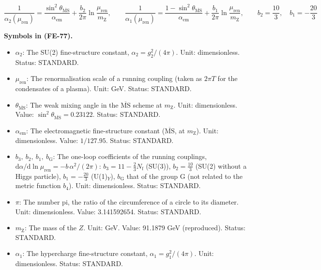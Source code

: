 \documentclass[
  10pt,
]{article}
\providecommand{\tightlist}{%
  \setlength{\itemsep}{0pt}\setlength{\parskip}{0pt}}
\begin{document}
\[
\frac{1}{\alpha_2(\mu_{\mathrm{ren}})} = \frac{\sin^2\theta_{\overline{\mathrm{MS}}}}{\alpha_{\mathrm{em}}}
 + \frac{b_2}{2\pi}\ln\frac{\mu_{\mathrm{ren}}}{m_{\mathrm{Z}}},\qquad
\frac{1}{\alpha_1(\mu_{\mathrm{ren}})} = \frac{1 -
 \sin^2\theta_{\overline{\mathrm{MS}}}}{\alpha_{\mathrm{em}}}
 + \frac{b_1}{2\pi}\ln\frac{\mu_{\mathrm{ren}}}{m_{\mathrm{Z}}},\qquad b_2 = \frac{10}{3},\quad b_1 =
 -\frac{20}{3} \tag{FE-77}
\]

\textbf{Symbols in (FE-77).}

\begin{itemize}
\tightlist
\item
  \(\alpha_2\): The SU(2) fine-structure constant,
  \(\alpha_2 = g_2^2/(4\pi)\). Unit: dimensionless. Status: STANDARD.
\item
  \(\mu_{\mathrm{ren}}\): The renormalisation scale of a running
  coupling (taken as \(2\pi T\) for the condensates of a plasma). Unit:
  GeV. Status: STANDARD.
\item
  \(\theta_{\overline{\mathrm{MS}}}\): The weak mixing angle in the
  \(\overline{\mathrm{MS}}\) scheme at \(m_{\mathrm{Z}}\). Unit:
  dimensionless. Value:
  \(\sin^2\theta_{\overline{\mathrm{MS}}} = 0.23122\). Status: STANDARD.
\item
  \(\alpha_{\mathrm{em}}\): The electromagnetic fine-structure constant
  (\(\overline{\mathrm{MS}}\), at \(m_{\mathrm{Z}}\)). Unit:
  dimensionless. Value: \(1/127.95\). Status: STANDARD.
\item
  \(b_3,\ b_2,\ b_1,\ b_{\mathrm{G}}\): The one-loop coefficients of the
  running couplings,
  \(\mathrm{d}\alpha/\mathrm{d}\ln\mu_{\mathrm{ren}} = -b\,\alpha^2/(2\pi)\):
  \(b_3 = 11 - \frac23N_{\mathrm{f}}\) (SU(3)), \(b_2 = \frac{10}{3}\)
  (SU(2) without a Higgs particle), \(b_1 = -\frac{20}{3}\)
  (U(1)\(_Y\)), \(b_{\mathrm{G}}\) that of the group G (not related to
  the metric function \(b_4\)). Unit: dimensionless. Status: STANDARD.
\item
  \(\pi\): The number pi, the ratio of the circumference of a circle to
  its diameter. Unit: dimensionless. Value: 3.141592654. Status:
  STANDARD.
\item
  \(m_{\mathrm{Z}}\): The mass of the \(Z\). Unit: GeV. Value: 91.1879
  GeV (reproduced). Status: STANDARD.
\item
  \(\alpha_1\): The hypercharge fine-structure constant,
  \(\alpha_1 = g_1^2/(4\pi)\). Unit: dimensionless. Status: STANDARD.
\end{itemize}
\end{document}
